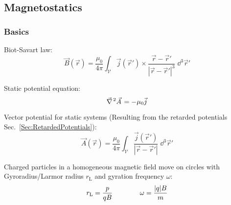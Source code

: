 	\subsection{Magnetostatics}
		\subsubsection{Basics}
			\noindent
			Biot-Savart law:
			\begin{equation}
				\vec{B}(\vec{r}) = \frac{\mu_0}{4\pi}\int_{\mathcal{V}} \vec{j}(\vec{r}')\times\frac{\vec{r}-\vec{r}'}{\left|\vec{r}-\vec{r}'\right|^3}\;\dd^3\vec{r}'
			\end{equation}

			\noindent
			Static potential equation:
			\begin{equation}
				\Nabla^2 \vec{A} = - \mu_0 \vec{j}
			\end{equation}

			\noindent
			Vector potential for static systems (Resulting from the retarded potentials Sec.~\ref{Sec:RetardedPotentials}):
			\begin{equation}
				\vec{A}(\vec{r}) = \frac{\mu_0}{4\pi} \int_{\mathcal{V}} \frac{\vec{j}(\vec{r}')}{\left|\vec{r}-\vec{r}'\right|} \;\dd^3\vec{r}'
			\end{equation}

			\noindent
			Charged particles in a homogeneous magnetic field move on circles with Gyroradius/Larmor radius $r_\text{L}$ and gyration frequency $\omega$:
			\begin{equation}
				\begin{aligned}
					r_\text{L} = \frac{p}{qB} &&\hspace{30pt}
					\omega = \frac{|q| B}{m}
				\end{aligned}
			\end{equation}

